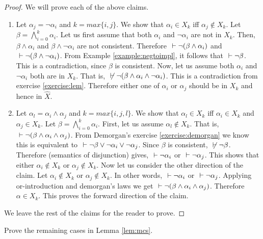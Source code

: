 \begin{proof}
We will prove each of the above claims.
\begin{enumerate}
\item Let $\alpha_j = \neg \alpha_i$ and $k = max \{i,j\}$. We show that  $\alpha_i \in X_k$ iff $\alpha_j \notin X_k$. Let $\beta = \bigwedge_{i=0}^k \alpha_i$. Let us first assume that both $\alpha_i$ and $\neg \alpha_i$ are not in $X_k$. Then, $\beta \wedge \alpha_i$ and $\beta \wedge \neg \alpha_i$ are not consistent. Therefore \true $~\vdash \neg (\beta \wedge \alpha_i)$ and \true $~\vdash \neg (\beta \wedge \neg \alpha_i)$. From Example \ref{example:negtoimpl}, it follows that \true $~\vdash \neg \beta$. This is a contradiction, since $\beta$ is consistent. Now, let us assume both $\alpha_i$ and $\neg \alpha_i$ both are in $X_k$. That is, \true $~ \not \vdash \neg (\beta \wedge \alpha_i \wedge \neg \alpha_i)$. This is a contradiction from exercise \ref{exercise:lem}. Therefore either one of $\alpha_i$ or $\alpha_j$ should be in $X_k$ and hence in $\hat X$.
\item Let $\alpha_l = \alpha_i \wedge \alpha_j$ and $k = max\{i,j,l\}$. We show that  $\alpha_l \in X_k$ iff $\alpha_i \in X_k$ and $\alpha_j \in X_k$. Let $\beta = \bigwedge_{i=0}^k \alpha_i$. First, let us assume $\alpha_l \notin X_k$. That is, \true $~\vdash \neg (\beta \wedge \alpha_i \wedge \alpha_j)$. From Demorgan's exercise \ref{exercise:demorgan} we know this is equivalent to \true $~\vdash \neg \beta \vee \neg \alpha_i \vee  \neg \alpha_j$. Since $\beta$ is consistent, \true $~\not \vdash \neg \beta$. Therefore (semantics of disjunction) gives, \true $~\vdash  \neg \alpha_i$ or \true $~\vdash  \neg \alpha_j$. This shows that either $\alpha_i \notin X_k$ or $\alpha_j \notin X_k$. Now let us consider the other direction of the claim. Let $\alpha_i \notin X_k$ or $\alpha_j \notin X_k$. In other words, \true $~\vdash  \neg \alpha_i$ or \true $~\vdash  \neg \alpha_j$. Applying or-introduction and demorgan's laws we get \true $~\vdash \neg (\beta \wedge \alpha_i \wedge \alpha_j)$. Therefore $\alpha \in X_k$. This proves the forward direction of the claim.
\end{enumerate}

We leave the rest of the claims for the reader to prove.
\end{proof}

\begin{exercise}
Prove the remaining cases in Lemma \ref{lem:mcs}.
\end{exercise}

